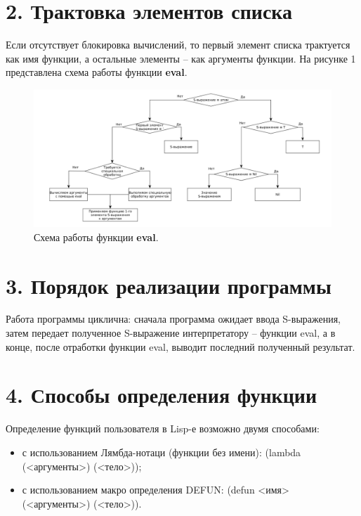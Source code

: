 \documentclass[12pt]{report}
\begin{document}
\section*{2. Трактовка элементов списка}

Если отсутствует блокировка вычислений, то первый элемент списка трактуется как имя функции, а остальные элементы – как аргументы функции. На рисунке 1 представлена схема работы функции \textbf{eval}.

\begin{figure}[H]
	\begin{center}
		\includegraphics[scale=0.5]{imgs/eval.png}
	\end{center}
	\caption{Схема работы функции \textbf{eval}.}
	\label{img:eval}
\end{figure}

\section*{3. Порядок реализации программы}

Работа программы циклична: сначала программа ожидает ввода S-выражения, затем передает полученное S-выражение интерпретатору – функции eval, а в конце, после отработки функции eval, выводит последний полученный результат.\newline


\section*{4. Способы определения функции}

Определение функций пользователя в Lisp-е возможно двумя способами:
\begin{itemize}
	\item с использованием Лямбда-нотаци (функции без имени): (lambda (<аргументы>) (<тело>));
	\item с использованием макро определения DEFUN: (defun <имя> (<аргументы>) (<тело>)).
\end{itemize}
\end{document}
